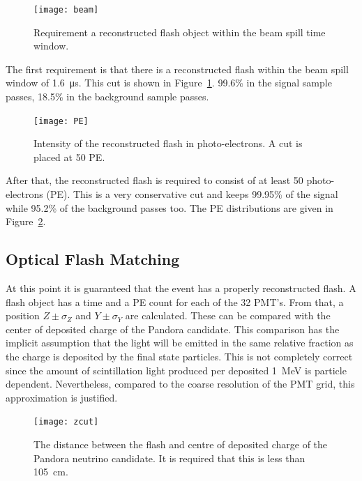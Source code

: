 \begin{figure}[!htbp]
\centering
\texttt{[image: beam]}
\caption{Requirement a reconstructed flash object within the beam spill time window.} 
\label{fig:beam}
\end{figure}

The first requirement is that there is a reconstructed flash within the beam spill window of \SI{1.6}{\micro\s}. This cut is shown in Figure~\ref{fig:beam}. 99.6\% in the signal sample passes, 18.5\% in the background sample passes.

\begin{figure}[htbp]
\centering
\texttt{[image: PE]}
\caption{Intensity of the reconstructed flash in photo-electrons. A cut is placed at 50 PE.} 
\label{fig:PE}
\end{figure}

After that, the reconstructed flash is required to consist of at least 50 photo-electrons (PE). This is a very conservative cut and keeps 99.95\% of the signal while 95.2\% of the background passes too. The PE distributions are given in Figure~\ref{fig:PE}.


\subsection{Optical Flash Matching}

At this point it is guaranteed that the event has a properly reconstructed flash. A flash object has a time and a PE count for each of the 32 PMT's. From that, a position $Z\pm \sigma_Z$ and $Y\pm \sigma_Y$ are calculated. These can be compared with the center of deposited charge of the Pandora candidate. This comparison has the implicit assumption that the light will be emitted in the same relative fraction as the charge is deposited by the final state particles. This is not completely correct since the amount of scintillation light produced per deposited \SI{1}{\MeV} is particle dependent. Nevertheless, compared to the coarse resolution of the PMT grid, this approximation is justified. 

\begin{figure}[htbp]
\centering
\texttt{[image: zcut]}
\caption{The distance between the flash and centre of deposited charge of the Pandora neutrino candidate. It is required that this is less than \SI{105}{\cm}.} 
\label{fig:zcut}
\end{figure}

